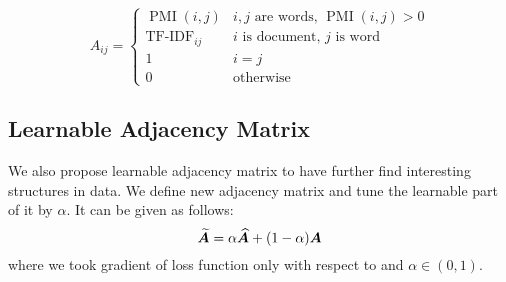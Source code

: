     \begin{equation}
    A_{i j}= \begin{cases}\operatorname{PMI}(i, j) & i, j \text { are words, } \operatorname{PMI}(i, j)>0 \\ \operatorname{TF-IDF}_{i j} & i \text { is document, } j \text { is word } \\ 1 & i=j \\ 0 & \text {otherwise }\end{cases}    
    \end{equation}

\subsection{Learnable Adjacency Matrix}
We also propose learnable adjacency matrix to have further find interesting structures in data. We define new adjacency matrix and tune the learnable part of it by $\alpha$. It can be given as follows:
    \begin{equation}
        \boldsymbol{\widetilde{A}} = \alpha\boldsymbol{\widehat{A}} + (1-\alpha)\boldsymbol{A}
    \end{equation}
    where we took gradient of loss function only with respect to  and $\alpha \in (0,1)$.
    
